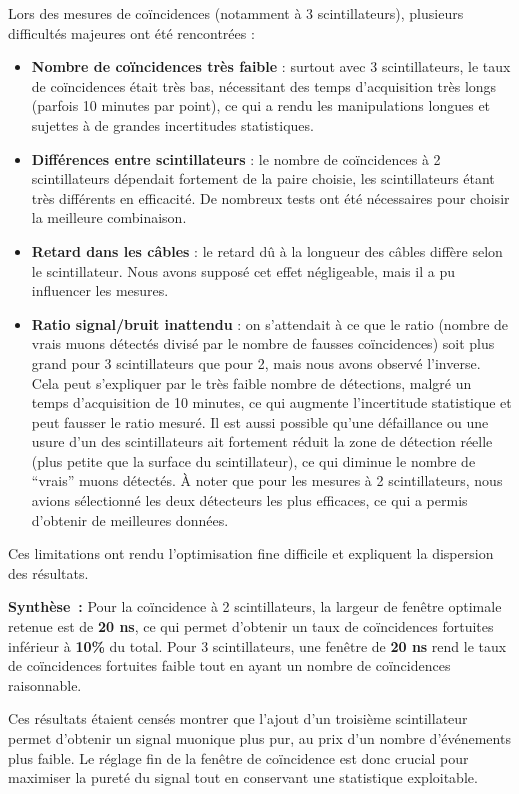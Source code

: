 \documentclass[a4paper,12pt,twoside]{article}
\begin{document}
\begin{center}
\begin{tcolorbox}[colback=red!5!white, colframe=red!80!black, title=Problèmes rencontrés lors des mesures de coïncidences]
Lors des mesures de coïncidences (notamment à 3 scintillateurs), plusieurs difficultés majeures ont été rencontrées :
\begin{itemize}
    \item \textbf{Nombre de coïncidences très faible} : surtout avec 3 scintillateurs, le taux de coïncidences était très bas, nécessitant des temps d'acquisition très longs (parfois 10 minutes par point), ce qui a rendu les manipulations longues et sujettes à de grandes incertitudes statistiques.
    \item \textbf{Différences entre scintillateurs} : le nombre de coïncidences à 2 scintillateurs dépendait fortement de la paire choisie, les scintillateurs étant très différents en efficacité. De nombreux tests ont été nécessaires pour choisir la meilleure combinaison.
    \item \textbf{Retard dans les câbles} : le retard dû à la longueur des câbles diffère selon le scintillateur. Nous avons supposé cet effet négligeable, mais il a pu influencer les mesures.
    \item \textbf{Ratio signal/bruit inattendu} : on s’attendait à ce que le ratio (nombre de vrais muons détectés divisé par le nombre de fausses coïncidences) soit plus grand pour 3 scintillateurs que pour 2, mais nous avons observé l’inverse. Cela peut s’expliquer par le très faible nombre de détections, malgré un temps d’acquisition de 10 minutes, ce qui augmente l’incertitude statistique et peut fausser le ratio mesuré. Il est aussi possible qu’une défaillance ou une usure d'un des scintillateurs ait fortement réduit la zone de détection réelle (plus petite que la surface du scintillateur), ce qui diminue le nombre de “vrais” muons détectés. À noter que pour les mesures à 2 scintillateurs, nous avions sélectionné les deux détecteurs les plus efficaces, ce qui a permis d’obtenir de meilleures données.
\end{itemize}
Ces limitations ont rendu l’optimisation fine difficile et expliquent la dispersion des résultats.
\end{tcolorbox}
\end{center}


\begin{remarque}
\textbf{Synthèse~:} Pour la coïncidence à 2 scintillateurs, la largeur de fenêtre optimale retenue est de \textbf{20 ns}, ce qui permet d’obtenir un taux de coïncidences fortuites inférieur à \textbf{10\%} du total. Pour 3 scintillateurs, une fenêtre de \textbf{20 ns} rend le taux de coïncidences fortuites faible tout en ayant un nombre de coïncidences raisonnable.

Ces résultats étaient censés montrer que l’ajout d’un troisième scintillateur permet d’obtenir un signal muonique plus pur, au prix d’un nombre d’événements plus faible. Le réglage fin de la fenêtre de coïncidence est donc crucial pour maximiser la pureté du signal tout en conservant une statistique exploitable.
\end{remarque}
\end{document}
